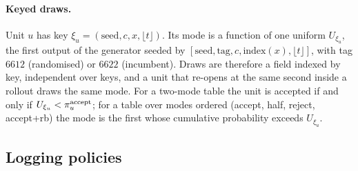 \paragraph{Keyed draws.} Unit $u$ has key $\xi_u = (\text{seed}, c, x, \lfloor t \rfloor)$. Its mode is a function of one uniform $U_{\xi_u}$, the first output of the generator seeded by $[\text{seed}, \text{tag}, c, \text{index}(x), \lfloor t \rfloor]$, with tag $6612$ (randomised) or $6622$ (incumbent). Draws are therefore a field indexed by key, independent over keys, and a unit that re-opens at the same second inside a rollout draws the same mode. For a two-mode table the unit is accepted if and only if $U_{\xi_u} < \pi_u^{\text{accept}}$; for a table over modes ordered (accept, half, reject, accept+rb) the mode is the first whose cumulative probability exceeds $U_{\xi_u}$.


\subsection{Logging policies}
\label{spec:sys.logging}

